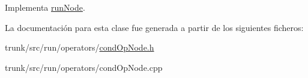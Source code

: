 Implementa \hyperlink{classrunNode_a83c10df8148829b08e04153c93d69eec}{run\-Node}.



La documentación para esta clase fue generada a partir de los siguientes ficheros\-:\begin{DoxyCompactItemize}
\item 
trunk/src/run/operators/\hyperlink{condOpNode_8h}{cond\-Op\-Node.\-h}\item 
trunk/src/run/operators/cond\-Op\-Node.\-cpp\end{DoxyCompactItemize}
